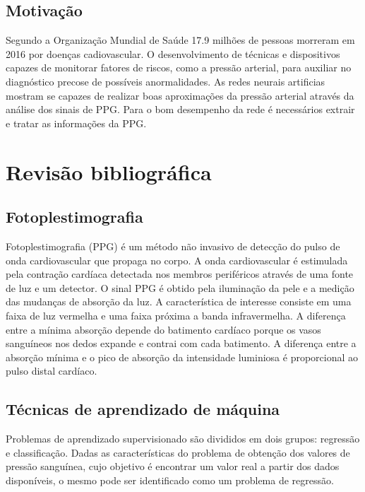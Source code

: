 \documentclass[conference,compsoc]{IEEEtran}
\begin{document}
\subsection{Motiva\c{c}\~ao}
Segundo a Organiza\c{c}\~ao Mundial de Sa\'ude \cite{WHO:2018} 17.9 milh\~oes de pessoas morreram em 2016 por doen\c{c}as cadiovascular. O desenvolvimento de t\'ecnicas e dispositivos capazes de monitorar fatores de riscos, como a press\~ao arterial, para auxiliar no diagn\'ostico precose de poss\'iveis anormalidades. As redes neurais artificias mostram se capazes de realizar boas aproxima\c{c}\~oes da press\~ao arterial atrav\'es da an\'alise dos sinais de PPG. Para o bom desempenho da rede \'e necess\'arios extrair e tratar as informa\c{c}\~oes da PPG.


\section{Revis\~ao bibliogr\'afica}

\subsection{Fotoplestimografia}
Fotoplestimografia (PPG) \'e um m\'etodo n\~ao invasivo de detec\c{c}\~ao do pulso de onda cardiovascular que propaga no corpo. A onda cardiovascular \'e estimulada pela contra\c{c}\~ao card\'iaca detectada nos membros perif\'ericos atrav\'es de uma fonte de luz e um detector. \cite{GEUN:2008}
O sinal PPG \'e obtido pela ilumina\c{c}\~ao da pele e a medi\c{c}\~ao das mudan\c{c}as de absor\c{c}\~ao da luz. A caracter\'istica de interesse consiste em uma faixa de luz vermelha  e uma faixa pr\'oxima a banda infravermelha. A diferen\c{c}a entre a m\'inima absor\c{c}\~ao depende do batimento card\'iaco porque os vasos sangu\'ineos nos dedos expande e contrai com cada batimento. A diferen\c{c}a entre a absor\c{c}\~ao m\'inima e o pico de absor\c{c}\~ao da intensidade luminiosa \'e proporcional ao pulso distal card\'iaco.\cite{MORENO:2011}

\subsection{T\'ecnicas de aprendizado de m\'aquina}
Problemas de aprendizado supervisionado são divididos em dois grupos: regressão e classificação. Dadas as características do problema de obtenção dos valores de pressão sanguínea, cujo objetivo é encontrar um valor real a partir dos dados disponíveis, o mesmo pode ser identificado como um problema de regressão.
\end{document}
